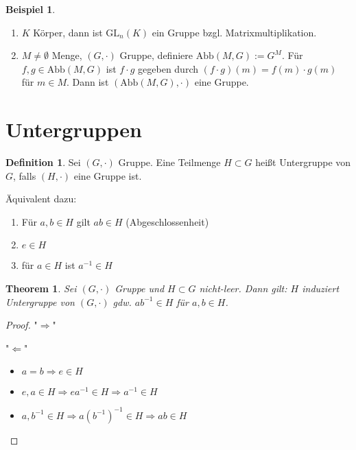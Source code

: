 \documentclass[12pt]{scrartcl}%
\newtheorem{thm}{Theorem}
\theoremstyle{definition}
\newtheorem*{defn}{Definition}
\newtheorem{ex}{Beispiel}
\theoremstyle{remark}
\newcommand{\implies}{\Rightarrow}
\newcommand{\gl}{\text{GL}}
\newcommand{\abb}{\text{Abb}}
\newcommand{\inv}[1]{\left(#1\right)^{-1}}
\newcommand{\Inv}[1]{#1^{-1}}
\begin{document}
\begin{ex}
    \begin{enumerate}
        \item $K$ Körper, dann ist $\gl_n(K)$ ein Gruppe bzgl. Matrixmultiplikation.
        \item $M\neq \emptyset$ Menge, $(G, \cdot)$ Gruppe, definiere $\abb(M,G):=G^M$. Für $f,g\in \abb(M,G)$ ist $f\cdot g$ gegeben durch $(f\cdot g)(m)=f(m)\cdot g(m)$ für $m\in M$. Dann ist $(\abb(M,G), \cdot)$ eine Gruppe.
    \end{enumerate}
\end{ex}

\section{Untergruppen}

\begin{defn}
    Sei $(G, \cdot)$ Gruppe. Eine Teilmenge $H\subset G$ heißt Untergruppe von $G$, falls $(H, \cdot)$ eine Gruppe ist.

    Äquivalent dazu:

    \begin{enumerate}[label=(\roman*)]
        \item Für $a,b\in H$ gilt $ab\in H$ (Abgeschlossenheit)
        \item $e\in H$
        \item für $a\in H$ ist $\Inv a \in H$
    \end{enumerate}
\end{defn}

\begin{thm}
    Sei $(G, \cdot)$ Gruppe und $H\subset G$ nicht-leer. Dann gilt: $H$ induziert Untergruppe von $(G, \cdot)$ gdw. $a\Inv b\in H$ für $a,b\in H$.
\end{thm}

\begin{proof}
    "$\Rightarrow$" \checkmark

    "$\Leftarrow$" 

    \begin{itemize} 
        \item $a=b \implies e\in H$
        \item $e,a\in H \implies e\Inv a\in H \implies \Inv a \in H$
        \item $a,\Inv b\in H \implies a\inv{\Inv b} \in H \implies ab\in H$
    \end{itemize}
\end{proof}
\end{document}
